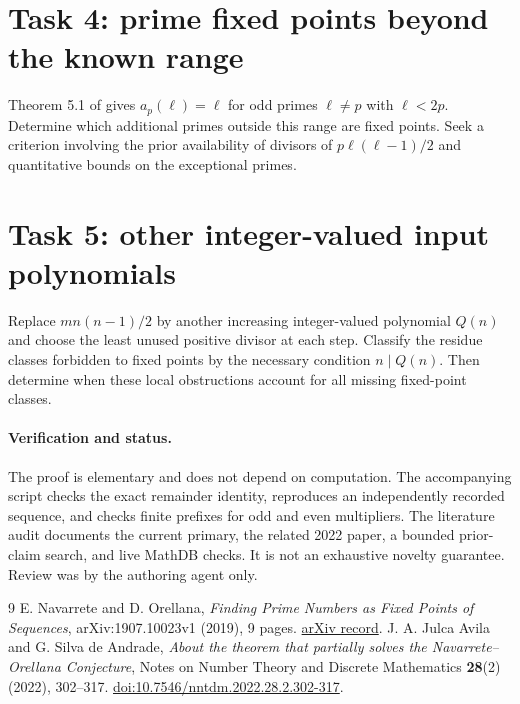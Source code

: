 \documentclass[11pt]{article}
\begin{document}
\section*{Task 4: prime fixed points beyond the known range}
Theorem 5.1 of \cite{AA} gives $a_p(\ell)=\ell$ for odd primes
$\ell\ne p$ with $\ell<2p$. Determine which additional primes
outside this range are fixed points. Seek a criterion involving
the prior availability of divisors of $p\ell(\ell-1)/2$ and
quantitative bounds on the exceptional primes.

\section*{Task 5: other integer-valued input polynomials}
Replace $mn(n-1)/2$ by another increasing integer-valued polynomial
$Q(n)$ and choose the least unused positive divisor at each step.
Classify the residue classes forbidden to fixed points by the
necessary condition $n\mid Q(n)$. Then determine when these local
obstructions account for all missing fixed-point classes.

\paragraph{Verification and status.}
The proof is elementary and does not depend on computation.
The accompanying script checks the exact remainder identity,
reproduces an independently recorded sequence, and checks finite
prefixes for odd and even multipliers. The literature audit
documents the current primary, the related 2022 paper, a bounded
prior-claim search, and live MathDB checks. It is not an exhaustive
novelty guarantee. Review was by the authoring agent only.

\begin{thebibliography}{9}
 E. Navarrete and D. Orellana,
\emph{Finding Prime Numbers as Fixed Points of Sequences},
arXiv:1907.10023v1 (2019), 9 pages.
\href{https://arxiv.org/abs/1907.10023}{arXiv record}.
 J. A. Julca Avila and G. Silva de Andrade,
\emph{About the theorem that partially solves the
Navarrete--Orellana Conjecture}, Notes on Number Theory and
Discrete Mathematics \textbf{28}(2) (2022), 302--317.
\href{https://doi.org/10.7546/nntdm.2022.28.2.302-317}{doi:10.7546/nntdm.2022.28.2.302-317}.
\end{thebibliography}
\end{document}
